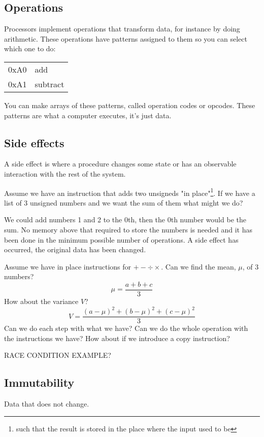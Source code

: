 \documentclass{article}
\begin{document}
\subsection{Operations}
Processors implement operations that transform data, for instance by doing
arithmetic. These operations have patterns assigned to them so you can select
which one to do:
\begin{tabular}{| l | l |}
\hline
0xA0 & add \\
0xA1 & subtract \\
\hline
\end{tabular}
You can make arrays of these patterns, called operation codes or opcodes.
These patterns are what a computer executes, it's just data.

\subsection{Side effects}
A side effect is where a procedure changes some state or has an observable
interaction with the rest of the system.

Assume we have an instruction that adds two unsigneds "in place"\footnote{such
that the result is stored in the place where the input used to be}.
If we have a list of 3 unsigned numbers and we want the sum of them what might we do?

We could add numbers 1 and 2 to the 0th, then the 0th number would be the sum.
No memory above that required to store the numbers is needed and it has been
done in the minimum possible number of operations. A side effect has occurred,
the original data has been changed.

Assume we have in place instructions for $+-\div\times$.
Can we find the mean, $\mu$, of 3 numbers?
\begin{displaymath}
\mu = \frac{a + b + c}{3}
\end{displaymath}
How about the variance $V$?
\begin{displaymath}
V = \frac{(a - \mu)^2 + (b - \mu)^2 + (c - \mu)^2}{3}
\end{displaymath}
Can we do each step with what we have?
Can we do the whole operation with the instructions we have?
How about if we introduce a copy instruction?

RACE CONDITION EXAMPLE?

\subsection{Immutability}
Data that does not change.
\end{document}
